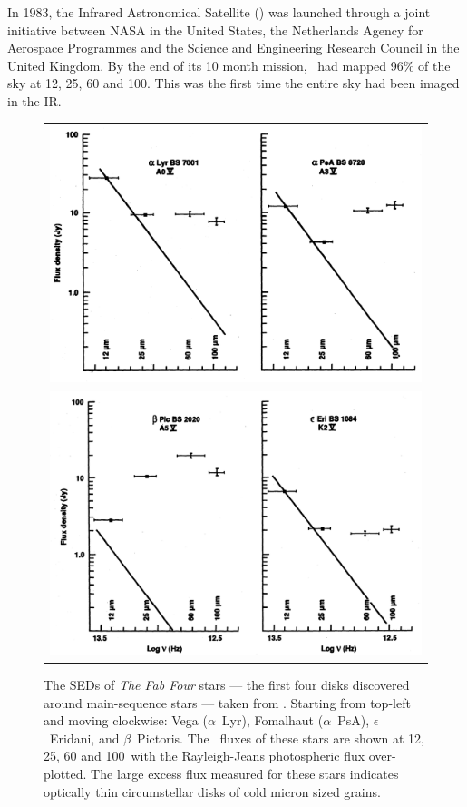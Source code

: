     In 1983, the Infrared Astronomical Satellite (\iras) was launched through a joint initiative between NASA in the United States, the Netherlands Agency for Aerospace Programmes and the Science and Engineering Research Council in the United Kingdom. By the end of its 10 month mission, \iras\ had mapped 96\% of the sky at 12, 25, 60 and 100\micron. This was the first time the entire sky had been imaged in the IR. 
    \begin{figure}[!h]
    \centering
    \begin{tabular}{c}
    \includegraphics[width=.55\textwidth]{Ch1/backman_parsece_1993_IRExcesses_1}  \\
     \includegraphics[width=.55\textwidth]{Ch1/backman_parsece_1993_IRExcesses_2}
    \end{tabular}
    \caption[SEDs of Fab Four Disks]{The SEDs of \textit{The Fab Four} stars --- the first four disks discovered around main-sequence stars --- taken from \citet{Backman1993}. Starting from top-left and moving clockwise: Vega ($\alpha$~Lyr), Fomalhaut ($\alpha$~PsA), $\epsilon$~Eridani, and $\beta$~Pictoris. The \iras\ fluxes of these stars are shown at 12, 25, 60 and 100\micron\ with the Rayleigh-Jeans photospheric flux over-plotted. The large excess flux measured for these stars indicates optically thin circumstellar disks of cold micron sized grains.}
    \label{fig:fab_four}
    \end{figure}
    

